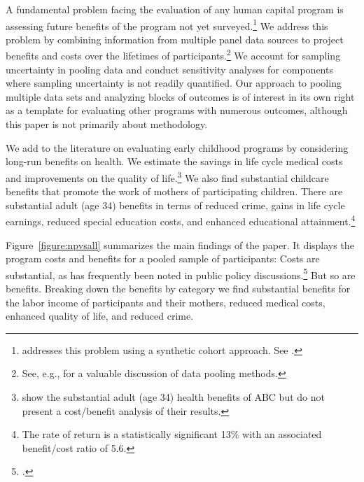 A fundamental problem facing the evaluation of any human capital program is assessing future benefits of the program not yet surveyed.\footnote{\cite{Mincer_1974_schooling} addresses this problem using a synthetic cohort approach. See \cite{Heckman_Lochner_ea_2006_HEE}.} We address this problem by combining information from multiple panel data sources to project benefits and costs over the lifetimes of participants.\footnote{See, e.g., \citealp{Ridder_Moffitt_2007_hbk_metricsdata} for a valuable discussion of data pooling methods.} We account for sampling uncertainty in pooling data and conduct sensitivity analyses for components where sampling uncertainty is not readily quantified. Our approach to pooling multiple data sets and analyzing blocks of outcomes is of interest in its own right as a template for evaluating other programs with numerous outcomes, although this paper is not primarily about methodology.

We add to the literature on evaluating early childhood programs by considering long-run benefits on health. We estimate the savings in life cycle medical costs and improvements on the quality of life.\footnote{\cite{Campbell_Conti_etal_2014_EarlyChildhoodInvestments} show the substantial adult (age 34) health benefits of ABC but do not present a cost/benefit analysis of their results.} We also find substantial childcare benefits that promote the work of mothers of participating children. There are substantial adult (age 34) benefits in terms of reduced crime, gains in life cycle earnings, reduced special education costs, and enhanced educational attainment.\footnote{The rate of return is a statistically significant 13\% with an associated benefit/cost ratio of 5.6.} 

Figure~\ref{figure:npvsall} summarizes the main findings of the paper. It displays the program costs and benefits for a pooled sample of participants: Costs are substantial, as has frequently been noted in public policy discussions.\footnote{\cite{Whitehurst_2014_Senate_Testimony}.} But so are benefits. Breaking down the benefits by category we find substantial benefits for the labor income of participants and their mothers, reduced medical costs, enhanced quality of life, and reduced crime.

